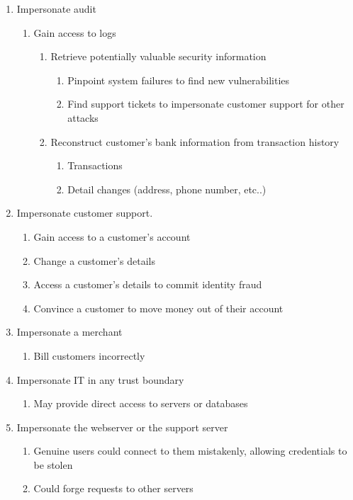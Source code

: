 \begin{enumerate}
    \item Impersonate audit
    \begin{enumerate}
        \item Gain access to logs
        \begin{enumerate}
            \item Retrieve potentially valuable security information
            \begin{enumerate}
                \item Pinpoint system failures to find new vulnerabilities
                \item Find support tickets to impersonate customer support for other attacks
            \end{enumerate}

            \item Reconstruct customer’s bank information from transaction history
            \begin{enumerate}
                \item Transactions
                \item Detail changes (address, phone number, etc..)
            \end{enumerate}
        \end{enumerate}
    \end{enumerate}
    
    \item Impersonate customer support.
    \begin{enumerate}
        \item Gain access to a customer's account
        \item Change a customer's details
        \item Access a customer's details to commit identity fraud
        \item Convince a customer to move money out of their account
    \end{enumerate}

    \item Impersonate a merchant
    \begin{enumerate}
        \item Bill customers incorrectly
    \end{enumerate}

    \item Impersonate IT in any trust boundary
    \begin{enumerate}
        \item May provide direct access to servers or databases
    \end{enumerate}

    \item Impersonate the webserver or the support server
    \begin{enumerate}
        \item Genuine users could connect to them mistakenly, allowing credentials to be stolen
        \item Could forge requests to other servers
    \end{enumerate}
\end{enumerate}

